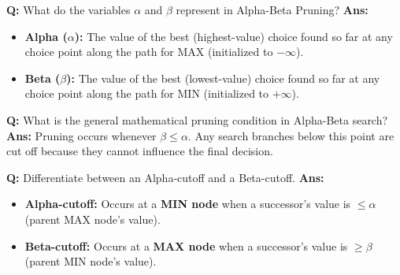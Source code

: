 \documentclass[10pt,a4paper,twocolumn]{article}
\begin{document}
\begin{tcolorbox}[
  colback=white,
  colframe=UnitColorSix,
  colbacktitle=gray!10!white,
  coltitle=black,
  fonttitle=\bfseries\sffamily\small,
  title={Unit VI $\bullet$ Card 4: Alpha-Beta Pruning Values},
  boxrule=1.2pt,
  arc=2mm,
  outer arc=2mm,
  boxsep=1.5mm,
  top=1mm,
  bottom=1mm,
  left=1.5mm,
  right=1.5mm,
  before skip=2.5mm,
  after skip=2.5mm
]
\textbf{Q:} What do the variables $\alpha$ and $\beta$ represent in Alpha-Beta Pruning?
\tcbline
\textbf{Ans:} \begin{itemize}
  \item   \textbf{Alpha ($\alpha$):} The value of the best (highest-value) choice found so far at any choice point along the path for MAX (initialized to $-\infty$).
  \item   \textbf{Beta ($\beta$):} The value of the best (lowest-value) choice found so far at any choice point along the path for MIN (initialized to $+\infty$).
\end{itemize}
\end{tcolorbox}


\begin{tcolorbox}[
  colback=white,
  colframe=UnitColorSix,
  colbacktitle=gray!10!white,
  coltitle=black,
  fonttitle=\bfseries\sffamily\small,
  title={Unit VI $\bullet$ Card 5: The Pruning Condition},
  boxrule=1.2pt,
  arc=2mm,
  outer arc=2mm,
  boxsep=1.5mm,
  top=1mm,
  bottom=1mm,
  left=1.5mm,
  right=1.5mm,
  before skip=2.5mm,
  after skip=2.5mm
]
\textbf{Q:} What is the general mathematical pruning condition in Alpha-Beta search?
\tcbline
\textbf{Ans:} Pruning occurs whenever $\beta \le \alpha$. Any search branches below this point are cut off because they cannot influence the final decision.
\end{tcolorbox}


\begin{tcolorbox}[
  colback=white,
  colframe=UnitColorSix,
  colbacktitle=gray!10!white,
  coltitle=black,
  fonttitle=\bfseries\sffamily\small,
  title={Unit VI $\bullet$ Card 6: Alpha-Cutoff vs. Beta-Cutoff},
  boxrule=1.2pt,
  arc=2mm,
  outer arc=2mm,
  boxsep=1.5mm,
  top=1mm,
  bottom=1mm,
  left=1.5mm,
  right=1.5mm,
  before skip=2.5mm,
  after skip=2.5mm
]
\textbf{Q:} Differentiate between an Alpha-cutoff and a Beta-cutoff.
\tcbline
\textbf{Ans:} \begin{itemize}
  \item   \textbf{Alpha-cutoff:} Occurs at a \textbf{MIN node} when a successor's value is $\le \alpha$ (parent MAX node's value).
  \item   \textbf{Beta-cutoff:} Occurs at a \textbf{MAX node} when a successor's value is $\ge \beta$ (parent MIN node's value).
\end{itemize}
\end{tcolorbox}
\end{document}
